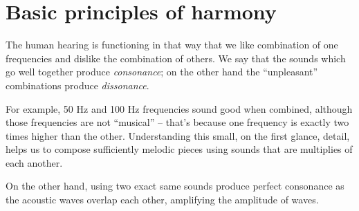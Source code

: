 \documentclass[../sparc.tex]{subfiles}
\begin{document}
\newpage
\section{Basic principles of harmony}

The human hearing is functioning in that way that we like combination of one
frequencies and dislike the combination of others.  We say that the sounds which
go well together produce \emph{consonance}; on the other hand the ``unpleasant''
combinations produce \emph{dissonance}.

For example, 50 Hz and 100 Hz frequencies sound good when combined, although
those frequencies are not ``musical'' -- that's because one frequency is exactly
two times higher than the other.  Understanding this small, on the first glance,
detail, helps us to compose sufficiently melodic pieces using sounds that are
multiplies of each another.

On the other hand, using two exact same sounds produce perfect consonance as the
acoustic waves overlap each other, amplifying the amplitude of waves.


\end{document}

